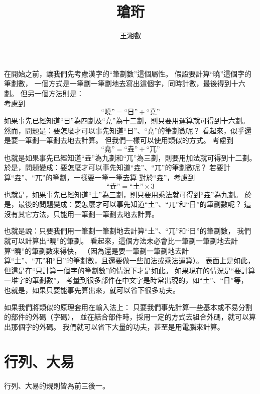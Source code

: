 \documentclass{article}
\title{瑲珩}
\author{王湘叡}
\begin{document}
\maketitle{}

在開始之前，讓我們先考慮漢字的``筆劃數''這個屬性。%
假設要計算``曉''這個字的筆劃數，%
一個方式是一筆劃一筆劃地去寫出這個字，同時計數，最後得到十六劃。%
但另一個方法則是：\\
考慮到\\
\[
  \mbox{``曉''}=\mbox{``日''}+\mbox{``堯''}
\]
如果事先已經知道``日''為四劃及``堯''為十二劃，則只要用運算就可得到十六劃。
然而，問題是：要怎麼才可以事先知道``日''、``堯''的筆劃數呢？
看起來，似乎還是要一筆劃一筆劃去地去計算。
但我們一樣可以使用類似的方式。
考慮到\\
\[
  \mbox{``堯''}=\mbox{``垚''}+\mbox{``兀''}
\]
也就是如果事先已經知道``垚''為九劃和``兀''為三劃，則要用加法就可得到十二劃。
於是，問題變成：要怎麼才可以事先知道``垚''、``兀''的筆劃數呢？
若要計算``垚''、``兀''的筆劃，一樣要一筆一筆去算
對於``垚''，考慮到\\
\[
  \mbox{``垚''}=\mbox{``土''}\times 3
\]
也就是，如果事先已經知道``土''為三劃，則只要用乘法就可得到``垚''為九劃。
於是，最後的問題變成：要怎麼才可以事先知道``土''、``兀''和``日''的筆劃數呢？
這沒有其它方法，只能用一筆劃一筆劃去地去計算。

也就是說：只要我們用一筆劃一筆劃地去計算``土''、``兀''和``日''的筆劃數，
我們就可以計算出``曉''的筆劃。
看起來，這個方法未必會比一筆劃一筆劃地去計算``曉''的筆劃數來得快，
（因為還是要一筆劃一筆劃地去計算``土''、``兀''和``日''的筆劃數，且還要做一些加法或乘法運算）。
表面上是如此，但這是在``只計算一個字的筆劃數''的情況下才是如此。
如果現在的情況是``要計算一堆字的筆劃數''，
考量到很多部件在中文字是時常出現的，如``土''、``日''等，
也就是，如果只要能事先算出來，就可以省下很多功夫。

如果我們將類似的原理套用在輸入法上：
只要我們事先計算一些基本或不易分割的部件的外碼（字碼），
並在結合部件時，採用一定的方式去組合外碼，就可以算出那個字的外碼。
我們就可以省下大量的功夫，甚至是用電腦來計算。

\section{行列、大易}
行列、大易的規則皆為前三後一。
\end{document}
